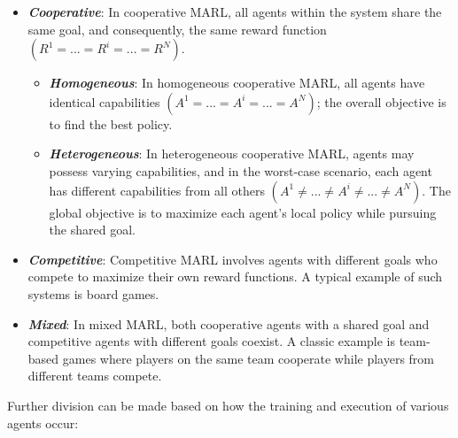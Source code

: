 \documentclass{scrartcl}
\begin{document}
\begin{itemize}
    \item \textbf{\textit{Cooperative}}: In cooperative MARL, all agents within the system share the same goal, and consequently, the same reward function $(R^1 = ... = R^i = ... = R^N)$.
    \begin{itemize}
        \item \textbf{\textit{Homogeneous}}: In homogeneous cooperative MARL, all agents have identical capabilities $(A^1 = ... = A^i = ... = A^N)$; the overall objective is to find the best policy. %
        \item \textbf{\textit{Heterogeneous}}: In heterogeneous cooperative MARL, agents may possess varying capabilities, and in the worst-case scenario, each agent has different capabilities from all others $(A^1 \neq ... \neq A^i \neq ... \neq A^N)$. The global objective is to maximize each agent's local policy while pursuing the shared goal.
    \end{itemize}
    \item \textbf{\textit{Competitive}}: Competitive MARL involves agents with different goals who compete to maximize their own reward functions. A typical example of such systems is board games.
    \item \textbf{\textit{Mixed}}: In mixed MARL, both cooperative agents with a shared goal and competitive agents with different goals coexist. A classic example is team-based games where players on the same team cooperate while players from different teams compete.
\end{itemize}

Further division can be made based on how the training and execution of various agents occur:

%     
\end{document}
